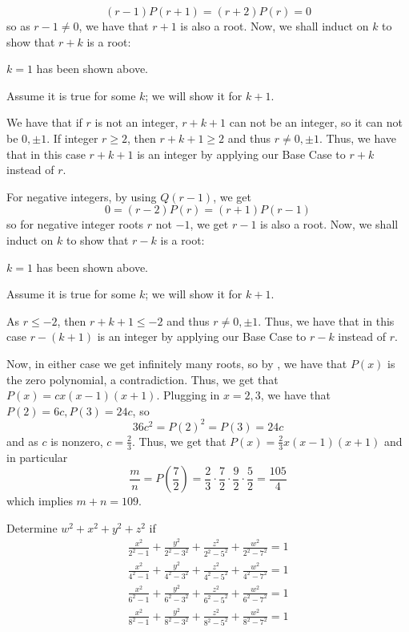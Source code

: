 \documentclass[11pt,titlepage]{scrartcl}
\begin{document}
\begin{soln}
\begin{formal_proof}
\[(r-1)P(r+1)=(r+2)P(r)=0\]
so as $r-1\neq 0$, we have that $r+1$ is also a root. Now, we shall induct on $k$ to show that $r+k$ is a root:\newline
\begin{alt_base_case}
$k=1$ has been shown above.
\end{alt_base_case}
\begin{alt_induction_hypothesis}
Assume it is true for some $k$; we will show it for $k+1$.
\end{alt_induction_hypothesis}
\begin{alt_induction_step}
We have that if $r$ is not an integer, $r+k+1$ can not be an integer, so it can not be $0,\pm 1$. If integer $r\geq 2$, then $r+k+1\geq 2$ and thus $r\neq 0,\pm 1$. Thus, we have that in this case $r+k+1$ is an integer by applying our Base Case to $r+k$ instead of $r$.
\end{alt_induction_step}
For negative integers, by using $Q(r-1)$, we get
\[0=(r-2)P(r)=(r+1)P(r-1)\]
so for negative integer roots $r$ not $-1$, we get $r-1$ is also a root. Now, we shall induct on $k$ to show that $r-k$ is a root:
\begin{alt_base_case}
$k=1$ has been shown above.
\end{alt_base_case}
\begin{alt_induction_hypothesis}
Assume it is true for some $k$; we will show it for $k+1$.
\end{alt_induction_hypothesis}
\begin{alt_base_case}
As $r\leq -2$, then $r+k+1\leq -2$ and thus $r\neq 0,\pm 1$. Thus, we have that in this case $r-(k+1)$ is an integer by applying our Base Case to $r-k$ instead of $r$.
\end{alt_base_case}
Now, in either case we get infinitely many roots, so by , we have that $P(x)$ is the zero polynomial, a contradiction. Thus, we get that $P(x)=cx(x-1)(x+1)$. Plugging in $x=2,3$, we have that $P(2)=6c,P(3)=24c$, so
\[36c^2=P(2)^2=P(3)=24c\]
and as $c$ is nonzero, $c=\tfrac 23$. Thus, we get that $P(x)=\tfrac 23x(x-1)(x+1)$ and in particular
\[\dfrac mn=P\left(\dfrac 72\right)=\dfrac 23\cdot\dfrac 72\cdot\dfrac 92\cdot\dfrac 52=\dfrac{105}4\]
which implies $m+n=\boxed{109}.$
\end{formal_proof}
\end{soln}
\begin{example}\label{lol}
Determine $w^2+x^2+y^2+z^2$ if
\[ \begin{array}{l} \displaystyle \frac{x^2}{2^2-1}+\frac{y^2}{2^2-3^2}+\frac{z^2}{2^2-5^2}+\frac{w^2}{2^2-7^2}=1 \\ \displaystyle \frac{x^2}{4^2-1}+\frac{y^2}{4^2-3^2}+\frac{z^2}{4^2-5^2}+\frac{w^2}{4^2-7^2}=1 \\ \displaystyle \frac{x^2}{6^2-1}+\frac{y^2}{6^2-3^2}+\frac{z^2}{6^2-5^2}+\frac{w^2}{6^2-7^2}=1 \\ \displaystyle \frac{x^2}{8^2-1}+\frac{y^2}{8^2-3^2}+\frac{z^2}{8^2-5^2}+\frac{w^2}{8^2-7^2}=1 \\ \end{array}  \]
\end{example}
\end{document}
